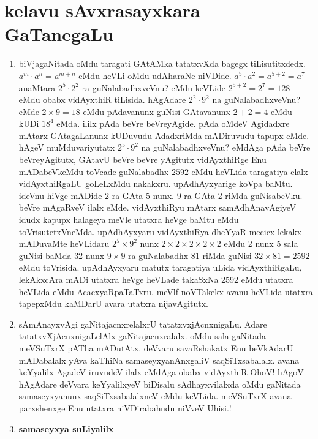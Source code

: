 \chapter{kelavu sAvxrasayxkara GaTanegaLu}

\begin{enumerate}[\rm 1)]
\item biVjagaNitada oMdu taragati GAtAMka tatatxvXda bagegx tiLisutitxdedx. $a^m\cdot a^n=a^{m+n}$ eMdu heVLi oMdu udAharaNe niVDide. $a^5\cdot a^2=a^{5+2}=a^7$ anaMtara $2^5\cdot 2^2$ ra guNalabadhxveVnu? eMdu keVLide $2^{5+2}=2^7=128$ eMdu obabx vidAyxthiR tiLisida. hAgAdare $2^2\cdot 9^2$ na guNalabadhxveVnu? eMde $2\times 9=18$ eMdu pAdavanunx guNisi GAtavanunx $2+2=4$ eMdu kUDi $18^4$ eMda. ililx pAda beVre beVreyAgide. pAda oMdeV Agidadxre mAtarx GAtagaLanunx kUDuvudu AdadxriMda mADiruvudu tapupx eMde. hAgeV muMduvariyutatx $2^5\cdot 9^2$ na guNalabadhxveVnu? eMdAga pAda beVre beVreyAgitutx, GAtavU beVre beVre yAgitutx vidAyxthiRge Enu mADabeVkeMdu toVcade guNalabadhx $2592$ eMdu heVLida taragatiya elalx vidAyxthiRgaLU goLeLxMdu nakakxru. upAdhAyxyarige koVpa baMtu. ideVnu hiVge mADide {\rm 2} ra GAta {\rm 5} nunx. {\rm 9} ra GAta {\rm 2} riMda guNisabeVku. beVre mAgaRveV ilalx eMde. vidAyxthiRyu mAtarx samAdhAnavAgiyeV idudx kapupx halageya meVle utatxra heVge baMtu eMdu toVrisutetxVneMda. upAdhAyxyaru vidAyxthiRya dheYyaR mecicx lekakx mADuvaMte heVLidaru $2^5\times 9^2$ nunx $2\times 2\times 2\times 2\times 2$ eMdu {\rm 2} nunx {\rm 5} sala guNisi baMda {\rm 32} nunx $9\times 9$ ra guNalabadhx {\rm 81} riMda guNisi $32\times 81=2592$ eMdu toVrisida. upAdhAyxyaru matutx taragatiya uLida vidAyxthiRgaLu, lekAkxcAra mADi utatxra heVge heVLade takaSxNa {\rm 2592} eMdu utatxra heVLida eMdu AcacxyaRpaTaTxru. meVlf noVTakekx avanu heVLida utatxra tapepxMdu kaMDarU avara utatxra nijavAgitutx.

\item sAmAnayxvAgi gaNitajacnxrelalxrU tatatxvxjAcnxnigaLu. Adare tatatxvXjAcnxnigaLelAlx gaNitajacnxralalx. oMdu sala gaNitada meVSuTxrX pATha mADutAtx. deVvaru savaRshakatx Enu beVkAdarU mADabalalx yAva kaThiNa samaseyxyanAnxgaliV saqSiTxsabalalx. avana keYyalilx AgadeV iruvudeV ilalx eMdAga obabx vidAyxthiR OhoV! hAgoV hAgAdare deVvara keYyalilxyeV biDisalu sAdhayxvilalxda oMdu gaNitada samaseyxyanunx saqSiTxsabalalxneV eMdu keVLida. meVSuTxrX avana parxshenxge Enu utatxra niVDirabahudu niVveV Uhisi.!

\item \textbf{samaseyxya suLiyalilx}


\end{enumerate}
